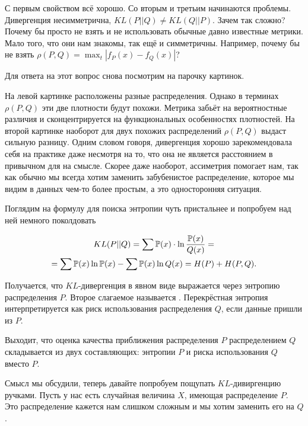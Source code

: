 \documentclass[12pt, a4paper, oneside]{article}
\begin{document}
С первым свойством всё хорошо. Со вторым и третьим начинаются проблемы. Дивергенция несимметрична, $KL(P || Q) \ne KL(Q || P)$. Зачем так сложно? Почему бы просто не взять и не использовать обычные давно известные метрики. Мало того, что они нам знакомы, так ещё и симметричны. Например, почему бы не взять $\rho(P,Q) = \max_t |f_P(x) - f_Q(x) |$? 

Для ответа на этот вопрос снова посмотрим на парочку картинок.


На левой картинке расположены разные распределения. Однако  в терминах $\rho(P,Q)$ эти две плотности будут похожи.  Метрика забьёт на вероятностные различия и сконцентрируется на функциональных особенностях плотностей. На второй картинке наоборот для двух похожих распределений $\rho(P,Q)$ выдаст сильную разницу. Одним словом говоря, дивергенция хорошо зарекомендовала себя на практике даже несмотря на то, что она не является расстоянием в привычном для на смысле. Скорее даже наоборот, ассиметрия помогает нам, так как обычно мы всегда хотим заменить забубенистое распределение, которое мы видим в данных чем-то более простым, а это односторонняя ситуация. 

Поглядим на формулу для поиска энтропии чуть пристальнее и попробуем над ней немного поколдовать

\begin{multline*}
KL(P || Q) = \sum \mathbb{P}(x) \cdot \ln \frac{ \mathbb{P}(x)}{Q(x)} = \\ = \sum \mathbb{P}(x) \ln \mathbb{P}(x) - \sum \mathbb{P}(x) \ln Q(x) = H(P) + H(P,Q).
\end{multline*}

Получается, что $KL$-дивергенция в явном виде выражается через энтропию распределения $P$.  Второе слагаемое называется .  Перекрёстная энтропия интерпретируется как риск использования распределения $Q$, если данные пришли из $P$. 

Выходит, что оценка качества приближения распределения $P$ распределением $Q$ складывается из двух составляющих: энтропии $P$ и риска использования $Q$ вместо $P$. 


Смысл мы обсудили, теперь давайте попробуем пощупать $KL$-дивиргенцию ручками. Пусть у нас есть случайная величина $X$, имеющая распределение $P$. Это распределение кажется нам слишком сложным и мы хотим заменить его на $Q$. 
\end{document}
